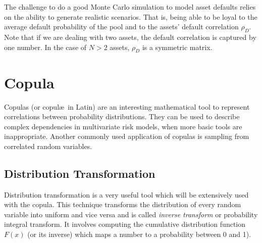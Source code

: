 %
%

The challenge to do a good Monte Carlo simulation to model asset defaults relies on the ability to generate realistic scenarios. That is, being able to be loyal to the average default probability of the pool and to the assets’ default correlation $\rho_D$. Note that if we are dealing with two assets, the default correlation is captured by one number. In the case of $N>2$ assets, $\rho_D$ is a symmetric matrix. 

\section{Copula}

Copulas (or copul\ae~in Latin) are an interesting mathematical tool to represent correlations between probability distributions. They can be used to describe complex dependencies in multivariate risk models, when more basic tools are inappropriate. Another commonly used application of copulas is sampling from correlated random variables.

\subsection{Distribution Transformation}
\label{distribution-transformation}

Distribution transformation is a very useful tool which will be extensively used with the copula. This technique transforms the distribution of every random variable into uniform and vice versa and is called \emph{inverse transform} or probability integral transform.
It involves computing the cumulative distribution function $F(x)$ (or its inverse) which maps a number to a probability between 0 and 1). 

